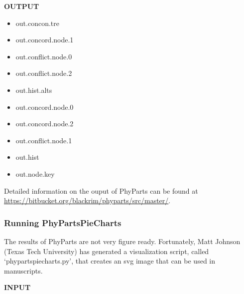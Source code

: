 \documentclass[
  12pt,
]{article}
\providecommand{\tightlist}{%
  \setlength{\itemsep}{0pt}\setlength{\parskip}{0pt}}
\begin{document}
\textbf{OUTPUT}

\begin{itemize}
\tightlist
\item
  out.concon.tre
\item
  out.concord.node.1
\item
  out.conflict.node.0
\item
  out.conflict.node.2
\item
  out.hist.alts
\item
  out.concord.node.0
\item
  out.concord.node.2
\item
  out.conflict.node.1
\item
  out.hist
\item
  out.node.key
\end{itemize}

Detailed information on the ouput of PhyParts can be found at \url{https://bitbucket.org/blackrim/phyparts/src/master/}.

\hypertarget{running-phypartspiecharts}{%
\subsubsection{Running PhyPartsPieCharts}\label{running-phypartspiecharts}}

The results of PhyParts are not very figure ready. Fortunately, Matt Johnson (Texas Tech University) has generated a visualization script, called `phypartspiecharts.py', that creates an svg image that can be used in manuscripts.

\textbf{INPUT}
\end{document}
